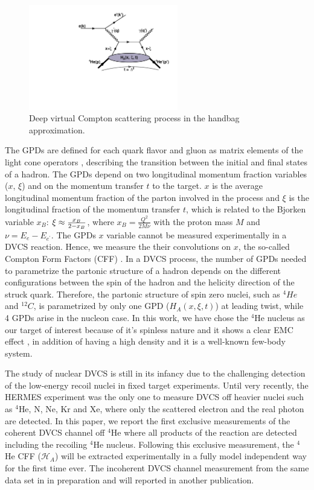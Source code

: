 \documentclass[nofootinbib,twocolumn,showpacs,prl,superscriptaddress,secnumarabic,amssymb,nobibnotes,aps,floatfix]{revtex4}
\begin{document}
\begin{figure}[tb]
\includegraphics[width=6.5cm]{figs/DVCS_diagram.pdf}
\vspace{-0.cm}
\caption{Deep virtual Compton scattering process in the handbag approximation.}
\label{fig:diags}
\end{figure}

The GPDs are defined for each quark flavor and gluon as matrix
elements of the light cone operators \cite{Belitsky}, describing the transition 
between the initial and final states of a hadron. The GPDs depend on two 
longitudinal momentum fraction variables ($x$, $\xi$) and on the momentum 
transfer $t$ to the target. $x$ is the average longitudinal momentum fraction 
of the parton involved in the process and $\xi$ is the longitudinal fraction of 
the momentum transfer $t$, which is related to the Bjorken variable $x_{B}$: 
$\xi\approx {{x_B}\over{2-x_B}}$, where $x_B=\frac{Q^2}{2M\nu}$ with
the proton mass $M$ and $\nu=E_e-E_{e^\prime}$. The GPDs $x$ variable cannot be 
measured experimentally in a DVCS reaction. Hence, we measure the their 
convolutions on $x$, the so-called Compton Form Factors (CFF) 
\cite{Guidal:2013rya}.  In a DVCS process, the number of GPDs needed to 
parametrize the partonic structure of a hadron depends on the different 
configurations between the spin of the hadron and the helicity direction of the 
struck quark.  Therefore, the partonic structure of spin zero nuclei, such as 
$^4He$ and $^{12}C$, is parametrized by only one GPD ($H_{A}(x,\xi,t)$) at 
leading twist, while 4 GPDs arise in the nucleon case.  In this work, we have 
chose the $^4$He nucleus as our target of interest because of it's spinless 
nature and it shows a clear EMC effect \cite{JSeely}, in addition of having a 
high density and it is a well-known few-body system.

The study of nuclear DVCS is still in its infancy due to the challenging 
detection of the low-energy recoil nuclei in fixed target experiments. Until 
very recently, the HERMES experiment \cite{Ellinghaus:2002zw} was the only one 
to measure DVCS off heavier nuclei such as $^4$He, N, Ne, Kr and Xe, where only 
the scattered electron and the real photon are detected. In this paper, we 
report the first exclusive measurements of the coherent DVCS channel off $^4$He 
where all products of the reaction are detected including the recoiling $^4$He 
nucleus. Following this exclusive measurement, the $^4$He CFF 
($\mathcal{H}_{A}$) will be extracted experimentally in a fully model 
independent way for the first time ever. The incoherent DVCS channel 
measurement from the same data set in in preparation and will reported in 
another publication. 
\end{document}
